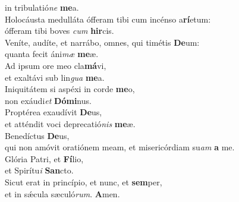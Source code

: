 \oddverse in tribulatió\textit{ne} \textbf{me}a.\\
\evenverse Holocáusta medulláta ófferam tibi cum incénso a\textbf{rí}etum:~\*\\
\evenverse ófferam tibi boves \textit{cum} \textbf{hir}cis.\\
\oddverse Veníte, audíte, et narrábo, omnes, qui timétis \textbf{De}um:~\*\\
\oddverse quanta fecit áni\textit{mæ} \textbf{me}æ.\\
\evenverse Ad ipsum ore meo cla\textbf{má}vi,~\*\\
\evenverse et exaltávi sub lin\textit{gua} \textbf{me}a.\\
\oddverse Iniquitátem si aspéxi in corde \textbf{me}o,~\*\\
\oddverse non exáudi\textit{et} \textbf{Dó}\textbf{mi}nus.\\
\evenverse Proptérea exaudívit \textbf{De}us,~\*\\
\evenverse et atténdit voci deprecatió\textit{nis} \textbf{me}æ.\\
\oddverse Benedíctus \textbf{De}us,~\*\\
\oddverse qui non amóvit oratiónem meam, et misericórdiam su\textit{am} \textbf{a} me.\\
\evenverse Glória Patri, et \textbf{Fí}lio,~\*\\
\evenverse et Spirítu\textit{i} \textbf{San}cto.\\
\oddverse Sicut erat in princípio, et nunc, et \textbf{sem}per,~\*\\
\oddverse et in sǽcula sæculó\textit{rum}. \textbf{A}men.\\
